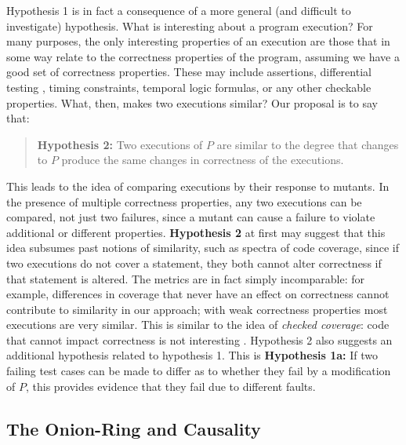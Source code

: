 Hypothesis 1 is in fact a consequence of a more general (and difficult to investigate) hypothesis.  What is interesting about a program execution?  For many purposes, the only interesting properties of an execution are those that in some way relate to the correctness properties of the program, assuming we have a good set of correctness properties.  These may include assertions, differential testing \cite{Differential,ICSEDiff}, timing constraints, temporal logic formulas, or any other checkable properties.  What, then, makes two executions similar?  Our proposal is to say that:

\begin{quote}
{\bf Hypothesis 2:} Two executions of $P$ are similar to the degree that changes to $P$ produce the same changes in correctness of the executions.
\end{quote}

This leads to the idea of comparing executions by their response to mutants.   In the presence of multiple correctness properties, any two executions can be compared, not just two failures, since a mutant can cause a failure to violate additional or different properties.
{\bf Hypothesis 2} at first may suggest that this idea subsumes past notions of similarity, such as spectra of code coverage, since if two executions do not cover a statement, they both cannot alter correctness if that statement is altered.  The metrics are in fact simply incomparable:  for example, differences in coverage that never have an effect on correctness cannot contribute to similarity in our approach; with weak correctness properties most executions are very similar.  This is similar to the idea of \emph{checked coverage}:  code that cannot impact correctness is not interesting \cite{CheckCov}.  Hypothesis 2 also suggests an additional hypothesis related to hypothesis 1.  This is {\bf Hypothesis 1a:} If two failing test cases can be made to differ as to whether they fail by a modification of $P$, this provides evidence that they fail due to different faults.

\subsection{The Onion-Ring and Causality}

